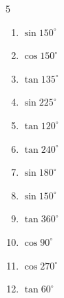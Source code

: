 \begin{multicols}{5}
\begin{enumerate}

  \item $\displaystyle \sin{150^\circ}$


  \item $\displaystyle \cos{150^\circ}$


  \item $\displaystyle \tan{135^\circ}$

        \phantom{$\displaystyle =-1$}

  \item $\displaystyle \sin{225^\circ}$


  \item $\displaystyle \tan{120^\circ}$


  \item $\displaystyle \tan{240^\circ}$


  \item $\displaystyle \sin{180^\circ}$

        \phantom{$\displaystyle =0$}

  \item $\displaystyle \sin{150^\circ}$


  \item $\displaystyle \tan{360^\circ}$

        \phantom{$\displaystyle =0$}

  \item $\displaystyle \cos{90^\circ}$

        \phantom{$\displaystyle =0$}

  \item $\displaystyle \cos{270^\circ}$

        \phantom{$\displaystyle =0$}

\columnbreak %

  \item $\displaystyle \tan{60^\circ}$



\end{enumerate}
\end{multicols}
